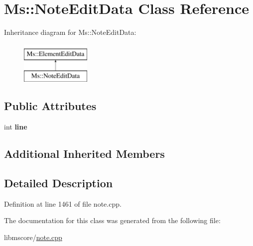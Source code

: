 \hypertarget{class_ms_1_1_note_edit_data}{}\section{Ms\+:\+:Note\+Edit\+Data Class Reference}
\label{class_ms_1_1_note_edit_data}
Inheritance diagram for Ms\+:\+:Note\+Edit\+Data\+:\begin{figure}[H]
\begin{center}
\leavevmode
\includegraphics[height=2.000000cm]{class_ms_1_1_note_edit_data}
\end{center}
\end{figure}
\subsection*{Public Attributes}
\begin{DoxyCompactItemize}
\item 
\mbox{\label{class_ms_1_1_note_edit_data_a2ffbe9747bacb638d94e7386bbf1e61e}} 
int {\bfseries line}
\end{DoxyCompactItemize}
\subsection*{Additional Inherited Members}


\subsection{Detailed Description}


Definition at line 1461 of file note.\+cpp.



The documentation for this class was generated from the following file\+:\begin{DoxyCompactItemize}
\item 
libmscore/\hyperlink{note_8cpp}{note.\+cpp}\end{DoxyCompactItemize}
